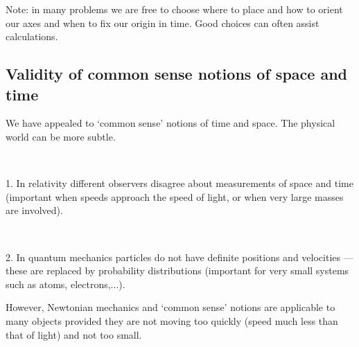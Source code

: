 

\vspace{10mm}

Note: in many problems we are free to choose where to place 
and how to orient our axes and when to
fix our origin in time. Good choices can often assist calculations.



\subsection{Validity of common sense notions of space and time}

We have appealed to `common sense' notions of time and space.
The physical world can be more subtle.

\vspace{3mm}

~~~~\begin{minipage}{100mm}
1. In relativity different observers disagree about measurements of
space and time (important when speeds approach the speed of light, or
when very large masses are involved).
\end{minipage}


\vspace{3mm}

~~~~\begin{minipage}{100mm}
2. In quantum mechanics particles do not have definite positions and velocities ---
these are replaced by probability distributions (important for very small systems
such as atoms, electrons,...).
\end{minipage}

\vspace{3mm}

\noindent
However, Newtonian mechanics and `common sense' notions are applicable to many
objects provided they are not moving too quickly (speed much less than that of light)
and not too small.


